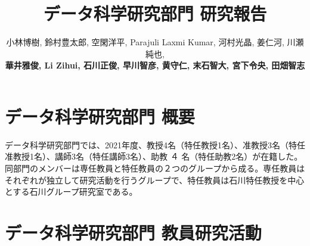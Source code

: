 \documentclass[11pt]{jarticle}
\title{データ科学研究部門 研究報告}
\author{小林博樹, 鈴村豊太郎, 空閑洋平, Parajuli Laxmi Kumar, 河村光晶, 姜仁河, 川瀬純也, \\
\textbf{華井雅俊, Li Zihui, 石川正俊, 早川智彦, 黄守仁, 末石智大, 宮下令央, 田畑智志}}
\begin{document}
\maketitle

\section{データ科学研究部門 概要}
データ科学研究部門では、2021年度、教授4名（特任教授1名）、准教授3名（特任准教授1名）、講師3名（特任講師3名）、助教 ４ 名（特任助教2名）が在籍した。同部門のメンバーは専任教員と特任教員の２つのグループから成る。専任教員はそれぞれが独立して研究活動を行うグループで、特任教員は石川特任教授を中心とする石川グループ研究室である。


%



\section{データ科学研究部門 教員研究活動}
\end{document}
